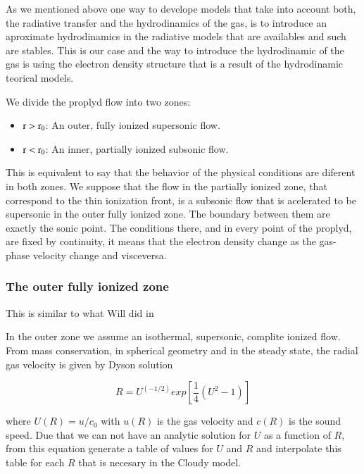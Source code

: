 \documentclass[aaspp]{article}
\begin{document}
As we mentioned above one way to develope models that take into account both, the radiative transfer and the hydrodinamics of the gas, is to introduce an aproximate hydrodinamics in the radiative models that are availables and such are stables. This is our case and the way to introduce the hydrodinamic of the gas is using the electron density structure that is a result of the hydrodinamic teorical models.

We divide the proplyd flow into two zones:

\begin{itemize}
  \item{$\rm r > r_0$: An outer, fully ionized supersonic flow.}
    \item{$\rm r < r_0$: An inner, partially ionized subsonic flow.}
\end{itemize}

This is equivalent to say that the behavior of the physical conditions are diferent in both zones. We suppose that the flow in the partially ionized zone, that correspond to the thin ionization front, is a subsonic flow that is acelerated to be supersonic in the outer fully ionized zone. The boundary between them are exactly the sonic point. The conditions there, and in every point of the proplyd, are fixed by continuity, it means that the electron density change as the gas-phase velocity change and visceversa. 


\subsubsection{The outer fully ionized zone}
\label{sec:outer}

This is similar to what Will did in \citep{2002ApJ...566..315H}

In the outer zone we assume an isothermal, supersonic, complite ionized flow. From mass conservation, in spherical geometry and in the steady state, the radial gas velocity is given by Dyson solution \citep{1968Ap&SS...1..388D}

\begin{equation}
  R = U^{(-1/2)} exp \left [ \frac{1}{4} \left (U^2 -1 \right )
  \right ]
\end{equation}

where $U(R) = u / c_0$ with $u(R)$ is the gas velocity and $c(R)$ is the sound speed. Due that we can not have an analytic solution for $U$ as a function of $R$, from this equation generate a table of values for $U$ and $R$ and interpolate this table for each $R$ that is necesary in the Cloudy model.
\end{document}
